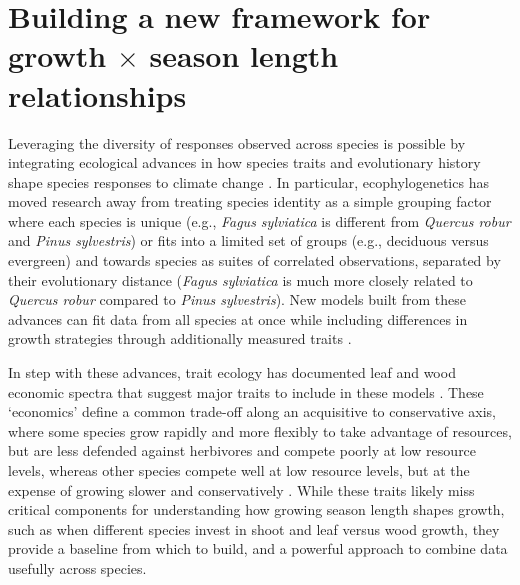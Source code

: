 \documentclass[11pt]{article}
\begin{document}
\section*{Building a new framework for growth $\times$ season length relationships} 

Leveraging the diversity of responses observed across species is possible by integrating ecological advances in how species traits and evolutionary history shape species responses to climate change \citep{cornwell2017phylogenetic}. In particular, ecophylogenetics \citep{Webb:2002or} has moved research away from treating species identity as a simple grouping factor where each species is unique (e.g., \emph{Fagus sylviatica} is different from \emph{Quercus robur} and \emph{Pinus sylvestris}) or fits into a limited set of groups (e.g., deciduous versus evergreen) and towards species as suites of correlated observations, separated by their evolutionary distance (\emph{Fagus sylviatica} is much more closely related to \emph{Quercus robur} compared to \emph{Pinus sylvestris}). New models built from these advances can fit data from all species at once while including differences in growth strategies through additionally measured traits \citep{pearse2019interaction,morales2024phylogenetic}. 

In step with these advances, trait ecology has documented leaf and wood economic spectra that suggest major traits to include in these models \citep[with related databases of these traits often available,][]{Chave2009,diaz2016}. These `economics' define a common trade-off along an acquisitive to conservative axis, where some species grow rapidly and more flexibly to take advantage of resources, but are less defended against herbivores and compete poorly at low resource levels, whereas other species compete well at low resource levels, but at the expense of growing slower and conservatively \citep[][]{Grime:1977sw,Chave2009,diaz2016}. While these traits likely miss critical components for understanding how growing season length shapes growth, such as when different species invest in shoot and leaf versus wood growth, they provide a baseline from which to build, and a powerful approach to combine data usefully across species. 
\end{document}
